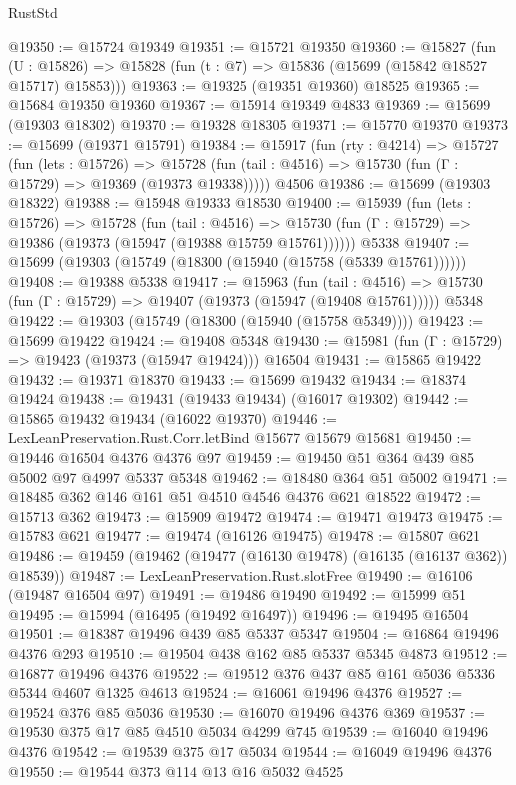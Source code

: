 \begin{lexlean}{RustStd}
\begin{coremodule}
@19350 := @15724 @19349
@19351 := @15721 @19350
@19360 := @15827
    (fun (U : @15826) => @15828 (fun (t : @7) => @15836 (@15699 (@15842 @18527 @15717) @15853)))
@19363 := @19325 (@19351 @19360) @18525
@19365 := @15684 @19350 @19360
@19367 := @15914 @19349 @4833
@19369 := @15699 (@19303 @18302)
@19370 := @19328 @18305
@19371 := @15770 @19370
@19373 := @15699 (@19371 @15791)
@19384 := @15917
    (fun (rty : @4214) =>
    @15727
      (fun (lets : @15726) =>
      @15728 (fun (tail : @4516) => @15730 (fun (Γ : @15729) => @19369 (@19373 @19338)))))
    @4506
@19386 := @15699 (@19303 @18322)
@19388 := @15948 @19333 @18530
@19400 := @15939
    (fun (lets : @15726) =>
    @15728
      (fun (tail : @4516) =>
      @15730 (fun (Γ : @15729) => @19386 (@19373 (@15947 (@19388 @15759 @15761))))))
    @5338
@19407 := @15699 (@19303 (@15749 (@18300 (@15940 (@15758 (@5339 @15761))))))
@19408 := @19388 @5338
@19417 := @15963
    (fun (tail : @4516) => @15730 (fun (Γ : @15729) => @19407 (@19373 (@15947 (@19408 @15761)))))
    @5348
@19422 := @19303 (@15749 (@18300 (@15940 (@15758 @5349))))
@19423 := @15699 @19422
@19424 := @19408 @5348
@19430 := @15981 (fun (Γ : @15729) => @19423 (@19373 (@15947 @19424))) @16504
@19431 := @15865 @19422
@19432 := @19371 @18370
@19433 := @15699 @19432
@19434 := @18374 @19424
@19438 := @19431 (@19433 @19434) (@16017 @19302)
@19442 := @15865 @19432 @19434 (@16022 @19370)
@19446 := LexLeanPreservation.Rust.Corr.letBind @15677 @15679 @15681
@19450 := @19446 @16504 @4376 @4376 @97
@19459 := @19450 @51 @364 @439 @85 @5002 @97 @4997 @5337 @5348
@19462 := @18480 @364 @51 @5002
@19471 := @18485 @362 @146 @161 @51 @4510 @4546 @4376 @621 @18522
@19472 := @15713 @362
@19473 := @15909 @19472
@19474 := @19471 @19473
@19475 := @15783 @621
@19477 := @19474 (@16126 @19475)
@19478 := @15807 @621
@19486 := @19459 (@19462 (@19477 (@16130 @19478) (@16135 (@16137 @362)) @18539))
@19487 := LexLeanPreservation.Rust.slotFree
@19490 := @16106 (@19487 @16504 @97)
@19491 := @19486 @19490
@19492 := @15999 @51
@19495 := @15994 (@16495 (@19492 @16497))
@19496 := @19495 @16504
@19501 := @18387 @19496 @439 @85 @5337 @5347
@19504 := @16864 @19496 @4376 @293
@19510 := @19504 @438 @162 @85 @5337 @5345 @4873
@19512 := @16877 @19496 @4376
@19522 := @19512 @376 @437 @85 @161 @5036 @5336 @5344 @4607 @1325 @4613
@19524 := @16061 @19496 @4376
@19527 := @19524 @376 @85 @5036
@19530 := @16070 @19496 @4376 @369
@19537 := @19530 @375 @17 @85 @4510 @5034 @4299 @745
@19539 := @16040 @19496 @4376
@19542 := @19539 @375 @17 @5034
@19544 := @16049 @19496 @4376
@19550 := @19544 @373 @114 @13 @16 @5032 @4525

\end{coremodule}
\end{lexlean}
